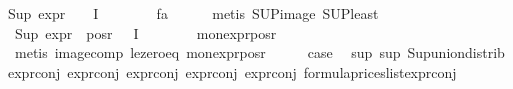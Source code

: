 \begin{isabellebody}
{\isachardoublequoteopen}Sup\ {\isacharparenleft}{\kern0pt}{\isacharparenleft}{\kern0pt}expr{\isacharunderscore}{\kern0pt}{}\ {\isasymcirc}\ {\isasymPhi}{\isacharparenright}{\kern0pt}\ {\isacharbackquote}{\kern0pt}\ I{\isacharparenright}{\kern0pt}\ {\isasymle}\ {}{\isachardoublequoteclose}\isanewline
\ \ \ \ \isamarkupfalse%
\ fa{\isacharunderscore}{\kern0pt}{\isasympsi}\isanewline
\ \ \ \ \isamarkupfalse%
\ {\isacharparenleft}{\kern0pt}metis\ SUP{\isacharunderscore}{\kern0pt}image\ SUP{\isacharunderscore}{\kern0pt}least{\isacharparenright}{\kern0pt}{\isacharplus}{\kern0pt}\isanewline
\ \ \isamarkupfalse%
\ {\isachardoublequoteopen}Sup\ {\isacharparenleft}{\kern0pt}expr{\isacharunderscore}{\kern0pt}{}\ {\isacharbackquote}{\kern0pt}\ {\isacharparenleft}{\kern0pt}pos{\isacharunderscore}{\kern0pt}r\ {\isacharparenleft}{\kern0pt}{\isasymPhi}\ {\isacharbackquote}{\kern0pt}\ I{\isacharparenright}{\kern0pt}{\isacharparenright}{\kern0pt}{\isacharparenright}{\kern0pt}\ {\isasymle}\ {}{\isachardoublequoteclose}\isanewline
\ \ \ \ \isamarkupfalse%
\ mon{\isacharunderscore}{\kern0pt}expr{\isacharunderscore}{\kern0pt}{}{\isacharunderscore}{\kern0pt}pos{\isacharunderscore}{\kern0pt}r\isanewline
\ \ \ \ \isamarkupfalse%
\ {\isacharparenleft}{\kern0pt}metis\ image{\isacharunderscore}{\kern0pt}comp\ le{\isacharunderscore}{\kern0pt}zero{\isacharunderscore}{\kern0pt}eq\ mon{\isacharunderscore}{\kern0pt}expr{\isacharunderscore}{\kern0pt}{}{\isacharunderscore}{\kern0pt}pos{\isacharunderscore}{\kern0pt}r{\isacharparenright}{\kern0pt}\isanewline
\ \ \isamarkupfalse%
\ \isamarkupfalse%
\ {\isacharquery}{\kern0pt}case\ \isamarkupfalse%
\ sup{\isacharunderscore}{\kern0pt}{\isasympsi}\ sup{\isacharunderscore}{\kern0pt}{\isasymphi}\ Sup{\isacharunderscore}{\kern0pt}union{\isacharunderscore}{\kern0pt}distrib\isanewline
expr{\isacharunderscore}{\kern0pt}{}{\isacharunderscore}{\kern0pt}conj\ expr{\isacharunderscore}{\kern0pt}{}{\isacharunderscore}{\kern0pt}conj\ expr{\isacharunderscore}{\kern0pt}{}{\isacharunderscore}{\kern0pt}conj\ expr{\isacharunderscore}{\kern0pt}{}{\isacharunderscore}{\kern0pt}conj\ expr{\isacharunderscore}{\kern0pt}{}{\isacharunderscore}{\kern0pt}conj\ formula{\isacharunderscore}{\kern0pt}prices{\isacharunderscore}{\kern0pt}list{\isachardot}{\kern0pt}expr{\isacharunderscore}{\kern0pt}{}{\isacharunderscore}{\kern0pt}conj\isanewline

\end{isabellebody}
